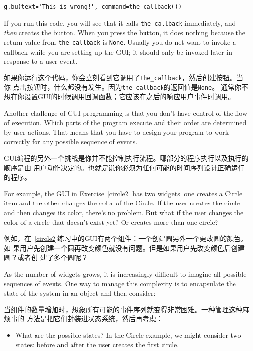 \documentclass[10pt]{book}
\begin{document}
\begin{CJK}{UTF8}{gbsn}
\begin{verbatim}
g.bu(text='This is wrong!', command=the_callback())
\end{verbatim}
%
If you run this code, you will see that it calls \verb"the_callback"
immediately, and {\em then} creates the button.  When you press the
button, it does nothing because the return value from 
\verb"the_callback" is {\tt None}.
Usually you do not want to invoke a callback while you are
setting up the GUI; it should only be invoked later in response to
a user event.

如果你运行这个代码，你会立刻看到它调用了\verb"the_callback"，然后创建按钮。当你
点击按钮时，什么都没有发生。因为\verb"the_callback"的返回值是{\tt None}。
通常你不想在你设置GUI的时候调用回调函数；它应该在之后的响应用户事件时调用。

Another challenge of GUI programming is that you don't have control
of the flow of execution.  Which parts of the program execute
and their order are determined by user actions.
That means that you have to design your program to work correctly
for any possible sequence of events.

GUI编程的另外一个挑战是你并不能控制执行流程。哪部分的程序执行以及执行的顺序是由
用户动作决定的。也就是说你必须为任何可能的时间序列设计正确运行的程序。

For example, the GUI in Exercise~\ref{circle2} has two widgets:
one creates a Circle item and the other changes the color of the
Circle.  If the user creates the circle and then changes its color,
there's no problem.  But what if the user changes the color of
a circle that doesn't exist yet?  Or creates more than one circle?

例如，在~\ref{circle2}练习中的GUI有两个组件：一个创建圆另外一个更改圆的颜色。如
果用户先创建一个圆再改变颜色就没有问题。但是如果用户先改变颜色后创建圆？或者创
建了多个圆呢？

As the number of widgets grows, it is increasingly difficult to
imagine all possible sequences of events.  One way to manage this 
complexity is to encapsulate the state of the system in an object
and then consider:

当组件的数量增加时，想象所有可能的事件序列就变得非常困难。一种管理这种麻烦事的
方法是把它们封装进状态系统，然后再考虑：

\begin{itemize}

\item What are the possible states?  In the Circle example, we
might consider two states: before and after the user creates the
first circle.


\end{itemize}
\end{CJK}
\end{document}
